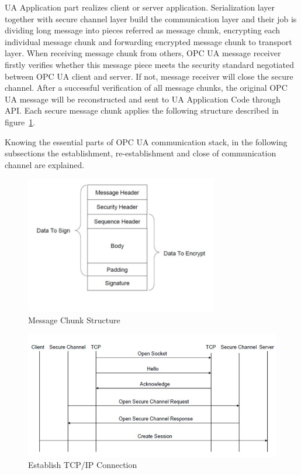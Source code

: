 \documentclass[]{llncs}
\begin{document}
UA Application part realizes client or server application. Serialization layer together with secure channel layer build the communication layer and their job is dividing long message into pieces referred as message chunk, encrypting each individual message chunk and forwarding encrypted message chunk to transport layer. When receiving message chunk from others, OPC UA message receiver firstly verifies whether this message piece meets the security standard negotiated between OPC UA client and server. If not, message receiver will close the secure channel. After a successful verification of all message chunks, the original OPC UA message will be reconstructed and sent to UA Application Code through API. Each secure message chunk applies the following structure described in figure~\ref{fig:opc_ua_messchunk}.

Knowing the essential parts of OPC UA communication stack, in the following subsections the establishment, re-establishment and close of communication channel are explained.

\begin{figure}[!htbp]
	\centering
	\includegraphics[width=0.75\textwidth]{opc_ua_messchunk.jpg}
		\caption[ ]{Message Chunk Structure\cite{O2}}
	\label{fig:opc_ua_messchunk}
\end{figure}

\begin{figure}[!htbp]
	\centering
	\includegraphics[width=1\textwidth]{tcp_1.jpg}
		\caption[ ]{Establish TCP/IP Connection\cite{O6}}
	\label{fig:tcp_1}
\end{figure}
\end{document}

